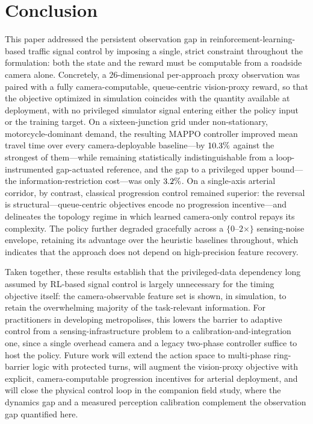 \section{Conclusion}
\label{sec:conclusion}

This paper addressed the persistent observation gap in reinforcement-learning-based traffic
signal control by imposing a single, strict constraint throughout the formulation: both the
state and the reward must be computable from a roadside camera alone. Concretely, a
$26$-dimensional per-approach proxy observation was paired with a fully camera-computable,
queue-centric vision-proxy reward, so that the objective optimized in simulation coincides with the
quantity available at deployment, with no privileged simulator signal entering either the
policy input or the training target. On a sixteen-junction grid under non-stationary,
motorcycle-dominant demand, the resulting MAPPO controller improved mean travel time over
every camera-deployable baseline---by $10.3\%$ against the strongest of
them---while remaining statistically indistinguishable from a loop-instrumented gap-actuated
reference, and the gap to a privileged upper bound---the information-restriction cost---was
only $3.2\%$. On a single-axis arterial corridor, by contrast, classical
progression control remained superior: the reversal is structural---queue-centric objectives
encode no progression incentive---and delineates the topology regime in which learned
camera-only control repays its complexity. The policy further degraded
gracefully across a $\{0\text{--}2\times\}$ sensing-noise envelope, retaining its advantage over
the heuristic baselines throughout, which indicates that the approach does not depend on
high-precision feature recovery.

Taken together, these results establish that the privileged-data dependency long assumed by
RL-based signal control is largely unnecessary for the timing objective itself: the
camera-observable feature set is shown, in simulation, to retain the overwhelming majority of
the task-relevant information. For practitioners in developing metropolises, this lowers the
barrier to adaptive control from a sensing-infrastructure problem to a calibration-and-integration
one, since a single overhead camera and a legacy two-phase controller suffice to host the policy.
Future work will extend the action space to multi-phase ring-barrier logic with protected
turns, will augment the vision-proxy objective with explicit, camera-computable progression
incentives for arterial deployment, and will close the physical control loop in the companion
field study, where the dynamics gap and a measured perception calibration complement the
observation gap quantified here.